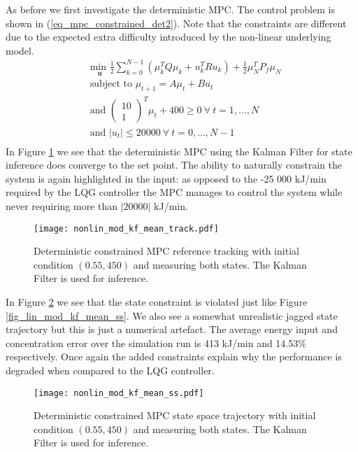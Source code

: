 As before we first investigate the deterministic MPC. The control problem is shown in (\ref{eq_mpc_constrained_det2}). Note that the constraints are different due to the expected extra difficulty introduced by the non-linear underlying model. 
\begin{equation}
\begin{aligned}
&\underset{\mathbf{u}}{\text{min }} \frac{1}{2}\sum_{k=0}^{N-1} \left( \mu_k^TQ\mu_k + u_k^TRu_k \right) + \frac{1}{2}\mu_N^TP_f\mu_N \\
& \text{subject to } \mu_{t+1}=A\mu_t + Bu_t \\
&\text{and } \begin{pmatrix}
10 \\ 1
\end{pmatrix}^T \mu_t + 400 \geq 0 ~\forall ~t=1,...,N\\
& \text{and } |u_t| \leq 20000 ~\forall ~t=0,...,N-1\\
\end{aligned}
\label{eq_mpc_constrained_det2}
\end{equation}
In Figure \ref{fig_nonlin_mod_kf_mean_track} we see that the deterministic MPC using the Kalman Filter for state inference does converge to the set point. The ability to naturally constrain the system is again highlighted in the input: as opposed to the -25 000 kJ/min required by the LQG controller the MPC manages to control the system while never requiring more than $|20000|$ kJ/min. 
\begin{figure}[H] 
\centering
\texttt{[image: nonlin\_mod\_kf\_mean\_track.pdf]}
\caption{Deterministic constrained MPC reference tracking with initial condition $(0.55, 450)$ and measuring both states. The Kalman Filter is used for inference.}
\label{fig_nonlin_mod_kf_mean_track}
\end{figure} 
In Figure \ref{fig_nonlin_mod_kf_mean_ss} we see that the state constraint is violated just like Figure \ref{fig_lin_mod_kf_mean_ss}. We also see a somewhat unrealistic jagged state trajectory but this is just a numerical artefact. The average energy input and concentration error over the simulation run is 413 kJ/min and 14.53\% respectively. Once again the added constraints explain why the performance is degraded when compared to the LQG controller.
\begin{figure}[H] 
\centering
\texttt{[image: nonlin\_mod\_kf\_mean\_ss.pdf]}
\caption{Deterministic constrained MPC state space trajectory with initial condition $(0.55, 450)$ and measuring both states. The Kalman Filter is used for inference.}
\label{fig_nonlin_mod_kf_mean_ss}
\end{figure}
